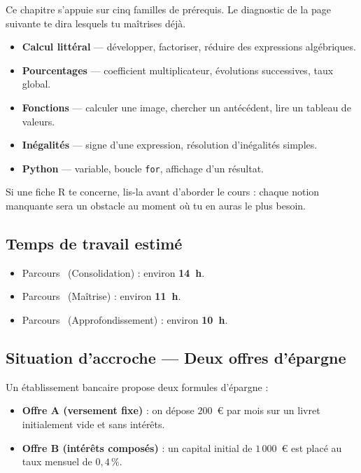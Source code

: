 Ce chapitre s'appuie sur cinq familles de prérequis. Le diagnostic de la page suivante te dira lesquels tu maîtrises déjà.

\begin{itemize}
  \item[\textbf{R1}] \textbf{Calcul littéral} — développer, factoriser, réduire des expressions algébriques.
  \item[\textbf{R2}] \textbf{Pourcentages} — coefficient multiplicateur, évolutions successives, taux global.
  \item[\textbf{R3}] \textbf{Fonctions} — calculer une image, chercher un antécédent, lire un tableau de valeurs.
  \item[\textbf{R4}] \textbf{Inégalités} — signe d'une expression, résolution d'inégalités simples.
  \item[\textbf{R5}] \textbf{Python} — variable, boucle \texttt{for}, affichage d'un résultat.
\end{itemize}

Si une fiche R te concerne, lis-la avant d'aborder le cours : chaque notion manquante sera un obstacle au moment où tu en auras le plus besoin.

\subsection*{Temps de travail estimé}

\begin{itemize}
  \item Parcours~\parcoursUn{} (Consolidation) : environ \textbf{14~h}.
  \item Parcours~\parcoursDeux{} (Maîtrise) : environ \textbf{11~h}.
  \item Parcours~\parcoursTrois{} (Approfondissement) : environ \textbf{10~h}.
\end{itemize}

\subsection*{Situation d'accroche — Deux offres d'épargne}

Un établissement bancaire propose deux formules d'épargne :

\begin{itemize}
  \item \textbf{Offre A (versement fixe)} : on dépose $200$~€ par mois sur
  un livret initialement vide et sans intérêts.
  \item \textbf{Offre B (intérêts composés)} : un capital initial de
  $1\,000$~€ est placé au taux mensuel de $0{,}4\,\%$.
\end{itemize}

